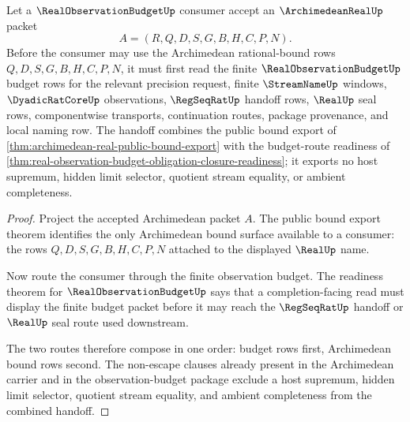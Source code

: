 \begin{theorem}
\label{thm:archimedean-real-budgeted-observation-handoff}
Let a $\RealObservationBudgetUp$ consumer accept an $\ArchimedeanRealUp$ packet
$$
A=(R,Q,D,S,G,B,H,C,P,N).
$$
Before the consumer may use the Archimedean rational-bound rows $Q,D,S,G,B,H,C,P,N$, it must first read the finite $\RealObservationBudgetUp$ budget rows for the relevant precision request, finite $\StreamNameUp$ windows, $\DyadicRatCoreUp$ observations, $\RegSeqRatUp$ handoff rows, $\RealUp$ seal rows, componentwise transports, continuation routes, package provenance, and local naming row. The handoff combines the public bound export of \autoref{thm:archimedean-real-public-bound-export} with the budget-route readiness of \autoref{thm:real-observation-budget-obligation-closure-readiness}; it exports no host supremum, hidden limit selector, quotient stream equality, or ambient completeness.
\end{theorem}
\begin{proof}
Project the accepted Archimedean packet $A$. The public bound export theorem identifies the only Archimedean bound surface available to a consumer: the rows $Q,D,S,G,B,H,C,P,N$ attached to the displayed $\RealUp$ name.

Now route the consumer through the finite observation budget. The readiness theorem for $\RealObservationBudgetUp$ says that a completion-facing read must display the finite budget packet before it may reach the $\RegSeqRatUp$ handoff or $\RealUp$ seal route used downstream.

The two routes therefore compose in one order: budget rows first, Archimedean bound rows second. The non-escape clauses already present in the Archimedean carrier and in the observation-budget package exclude a host supremum, hidden limit selector, quotient stream equality, and ambient completeness from the combined handoff.
\end{proof}

